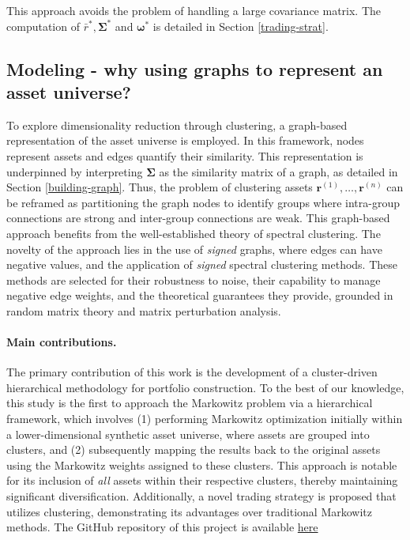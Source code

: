 \documentclass[sigconf]{acmart}
\begin{document}
This approach avoids the problem of handling a large covariance matrix. The computation of $\bar{r}^*, \boldsymbol{\Sigma}^*$ and $\boldsymbol{\omega}^*$ is detailed in Section \ref{trading-strat}.

\subsection{Modeling - why using graphs to represent an asset universe?}

To explore dimensionality reduction through clustering, a graph-based representation of the asset universe is employed. In this framework, nodes represent assets and edges quantify their similarity. This representation is underpinned by interpreting $\boldsymbol{\Sigma}$ as the similarity matrix of a graph, as detailed in Section \ref{building-graph}. Thus, the problem of clustering assets $\mathbf{r}^{(1)}, \ldots, \mathbf{r}^{(n)}$ can be reframed as partitioning the graph nodes to identify groups where intra-group connections are strong and inter-group connections are weak. This graph-based approach benefits from the well-established theory of spectral clustering. The novelty of the approach lies in the use of \textit{signed} graphs, where edges can have negative values, and the application of \textit{signed} spectral clustering methods. These methods are selected for their robustness to noise, their capability to manage negative edge weights, and the theoretical guarantees they provide, grounded in random matrix theory and matrix perturbation analysis.

\paragraph{\textbf{Main contributions.}}
The primary contribution of this work is the development of a cluster-driven hierarchical methodology for portfolio construction. To the best of our knowledge, this study is the first to approach the Markowitz problem via a hierarchical framework, which involves (1) performing Markowitz optimization initially within a lower-dimensional synthetic asset universe, where assets are grouped into clusters, and (2) subsequently mapping the results back to the original assets using the Markowitz weights assigned to these clusters. This approach is notable for its inclusion of \textit{all} assets within their respective clusters, thereby maintaining significant diversification. Additionally, a novel trading strategy is proposed that utilizes clustering, demonstrating its advantages over traditional Markowitz methods.
The GitHub repository of this project is available \href{https://github.com/NailKhelifa/Portfolio_clustering}{here}
\end{document}
